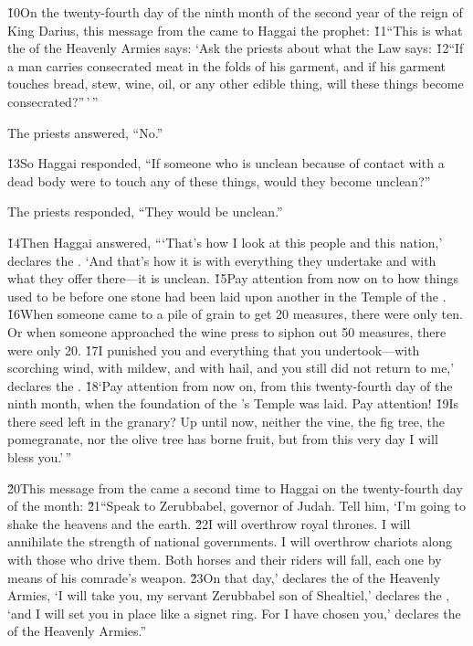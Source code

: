 \v{10}On the twenty-fourth day of the ninth month of the second year of the reign of King Darius, this message from the  came to Haggai the prophet: \v{11}``This is what the  of the Heavenly Armies says: `Ask the priests about what the Law says: \v{12}``If a man carries consecrated meat in the folds of his garment, and if his garment touches bread, stew, wine, oil, or any other edible thing, will these things become consecrated?''\,'\,''

The priests answered, ``No.''

\v{13}So Haggai responded, ``If someone who is unclean because of contact with a dead body were to touch any of these things, would they become unclean?''

The priests responded, ``They would be unclean.''

\v{14}Then Haggai answered, ```That's how I look at this people and this nation,' declares the . `And that's how it is with everything they undertake and with what they offer there---it is unclean. \v{15}Pay attention from now on to how things used to be before one stone had been laid upon another in the Temple of the . \v{16}When someone came to a pile of grain to get 20 measures, there were only ten. Or when someone approached the wine press to siphon out 50 measures, there were only 20. \v{17}I punished you and everything that you undertook---with scorching wind, with mildew, and with hail, and you still did not return to me,' declares the . \v{18}`Pay attention from now on, from this twenty-fourth day of the ninth month, when the foundation of the 's Temple was laid. Pay attention! \v{19}Is there seed left in the granary? Up until now, neither the vine, the fig tree, the pomegranate, nor the olive tree has borne fruit, but from this very day I will bless you.'\,''

\v{20}This message from the  came a second time to Haggai on the twenty-fourth day of the month: \v{21}``Speak to Zerubbabel, governor of Judah. Tell him, `I'm going to shake the heavens and the earth. \v{22}I will overthrow royal thrones. I will annihilate the strength of national governments. I will overthrow chariots along with those who drive them. Both horses and their riders will fall, each one by means of his comrade's weapon. \v{23}On that day,' declares the  of the Heavenly Armies, `I will take you, my servant Zerubbabel son of Shealtiel,' declares the , `and I will set you in place like a signet ring. For I have chosen you,' declares the  of the Heavenly Armies.''
